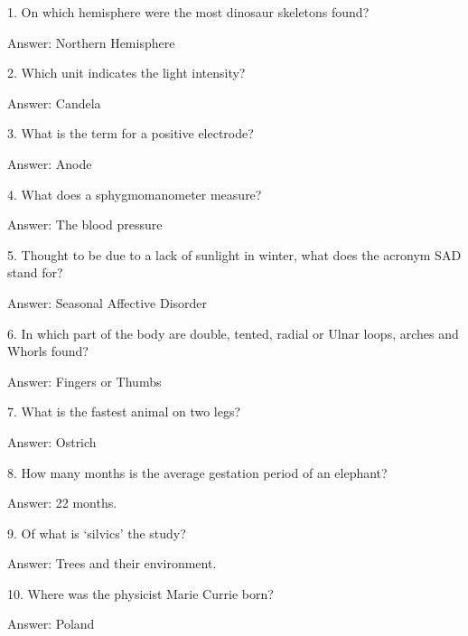 \documentclass{beamer}
\begin{document}
    \begin{frame}
        1. On which hemisphere were the most dinosaur skeletons found?

        Answer: Northern Hemisphere
    \end{frame}

    \begin{frame}
        2. Which unit indicates the light intensity?

        Answer: Candela
    \end{frame}

    \begin{frame}
        3. What is the term for a positive electrode?

        Answer: Anode
    \end{frame}

    \begin{frame}
        4. What does a sphygmomanometer measure?

        Answer: The blood pressure
    \end{frame}

    \begin{frame}
        5. Thought to be due to a lack of sunlight in winter, what does the
        acronym SAD stand for?

        Answer: Seasonal Affective Disorder
    \end{frame}

    \begin{frame}
        6. In which part of the body are double, tented, radial or Ulnar loops,
        arches and Whorls found?

        Answer: Fingers or Thumbs
    \end{frame}

    \begin{frame}
        7. What is the fastest animal on two legs?

        Answer: Ostrich
    \end{frame}

    \begin{frame}
        8. How many months is the average gestation period of an elephant?

        Answer: 22 months.
    \end{frame}

    \begin{frame}
        9.  Of what is `silvics' the study?

        Answer: Trees and their environment.
    \end{frame}

    \begin{frame}
        10. Where was the physicist Marie Currie born?

        Answer: Poland
    \end{frame}
\end{document}
